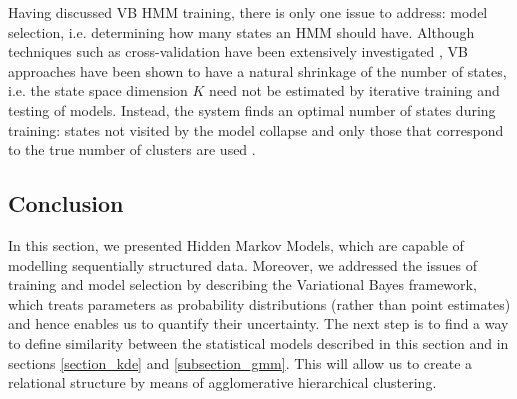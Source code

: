 \documentclass[../main.tex]{subfiles}
\begin{document}
\par Having discussed VB HMM training, there is only one issue to address: model selection, i.e. determining how many states an HMM should have. Although techniques such as cross-validation have been extensively investigated \cite{Siddiqi2007,Rezek2005}, VB approaches have been shown to have a natural shrinkage of the number of states, i.e. the state space dimension $K$ need not be estimated by iterative training and testing of models. Instead, the system finds an optimal number of states during training: states not visited by the model collapse and only those that correspond to the true number of clusters are used \cite{Rezek2005}. 

\subsection{Conclusion}
In this section, we presented Hidden Markov Models, which are capable of modelling sequentially structured data. Moreover, we addressed the issues of training and model selection by describing the Variational Bayes framework, which treats parameters as probability distributions (rather than point estimates) and hence enables us to quantify their uncertainty. The next step is to find a way to define similarity between the statistical models described in this section and in sections \ref{section_kde} and \ref{subsection_gmm}. This will allow us to create a relational structure by means of agglomerative hierarchical clustering.
\end{document}
